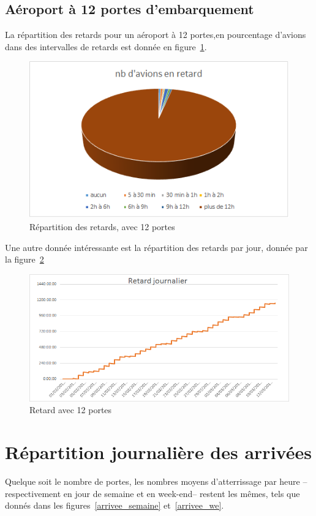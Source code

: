 \begin{table}[h]
 \subsection{Aéroport à 12 portes d'embarquement}
La répartition des retards pour un aéroport à 12 portes,en pourcentage d'avions dans des intervalles de retards est donnée en figure~\ref{retard_camenbert_12}.
  \graphicspath{{donnees/graph_90jours/12portes/}}
    \begin{figure}[h!]
 \includegraphics[scale=0.6]{retard_avions.bmp}
  \caption{\label{retard_camenbert_12} Répartition des retards, avec 12 portes} 
 \end{figure}
 
 Une autre donnée intéressante est la répartition des retards par jour, donnée par la figure~\ref{retard_jour_12}
   \begin{figure}[h!]
 \includegraphics{retard_jour.bmp}
  \caption{\label{retard_jour_12} Retard avec 12 portes} 
 \end{figure}
 
\section{Répartition journalière des arrivées}
Quelque soit le nombre de portes, les nombres moyens d'atterrissage par heure --respectivement en jour de semaine et en week-end-- restent les mêmes, tels que donnés dans les figures~\ref{arrivee_semaine} et~\ref{arrivee_we}.


\end{table}
